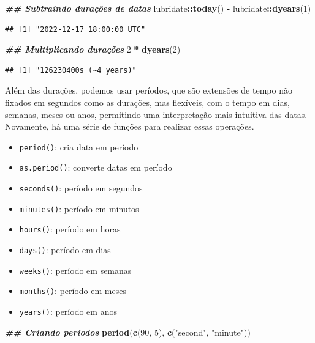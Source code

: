 \documentclass[
]{article}
\newenvironment{Shaded}{\begin{snugshade}}{\end{snugshade}}
\newcommand{\DecValTok}[1]{\textcolor[rgb]{0.00,0.00,0.81}{#1}}
\newcommand{\DocumentationTok}[1]{\textcolor[rgb]{0.56,0.35,0.01}{\textbf{\textit{#1}}}}
\newcommand{\FunctionTok}[1]{\textcolor[rgb]{0.13,0.29,0.53}{\textbf{#1}}}
\newcommand{\NormalTok}[1]{#1}
\newcommand{\SpecialCharTok}[1]{\textcolor[rgb]{0.81,0.36,0.00}{\textbf{#1}}}
\newcommand{\StringTok}[1]{\textcolor[rgb]{0.31,0.60,0.02}{#1}}
\providecommand{\tightlist}{%
  \setlength{\itemsep}{0pt}\setlength{\parskip}{0pt}}
\begin{document}
\begin{Shaded}
\begin{Highlighting}[]
\DocumentationTok{\#\# Subtraindo durações de datas}
\NormalTok{lubridate}\SpecialCharTok{::}\FunctionTok{today}\NormalTok{() }\SpecialCharTok{{-}}\NormalTok{ lubridate}\SpecialCharTok{::}\FunctionTok{dyears}\NormalTok{(}\DecValTok{1}\NormalTok{)}
\end{Highlighting}
\end{Shaded}

\begin{verbatim}
## [1] "2022-12-17 18:00:00 UTC"
\end{verbatim}

\begin{Shaded}
\begin{Highlighting}[]
\DocumentationTok{\#\# Multiplicando durações}
\DecValTok{2} \SpecialCharTok{*} \FunctionTok{dyears}\NormalTok{(}\DecValTok{2}\NormalTok{)}
\end{Highlighting}
\end{Shaded}

\begin{verbatim}
## [1] "126230400s (~4 years)"
\end{verbatim}

Além das durações, podemos usar períodos, que são extensões de tempo não fixados em segundos como as durações, mas flexíveis, com o tempo em dias, semanas, meses ou anos, permitindo uma interpretação mais intuitiva das datas. Novamente, há uma série de funções para realizar essas operações.

\begin{itemize}
\tightlist
\item
  \texttt{period()}: cria data em período
\item
  \texttt{as.period()}: converte datas em período
\item
  \texttt{seconds()}: período em segundos
\item
  \texttt{minutes()}: período em minutos
\item
  \texttt{hours()}: período em horas
\item
  \texttt{days()}: período em dias
\item
  \texttt{weeks()}: período em semanas
\item
  \texttt{months()}: período em meses
\item
  \texttt{years()}: período em anos
\end{itemize}

\begin{Shaded}
\begin{Highlighting}[]
\DocumentationTok{\#\# Criando períodos}
\FunctionTok{period}\NormalTok{(}\FunctionTok{c}\NormalTok{(}\DecValTok{90}\NormalTok{, }\DecValTok{5}\NormalTok{), }\FunctionTok{c}\NormalTok{(}\StringTok{"second"}\NormalTok{, }\StringTok{"minute"}\NormalTok{))}
\end{Highlighting}
\end{Shaded}
\end{document}
